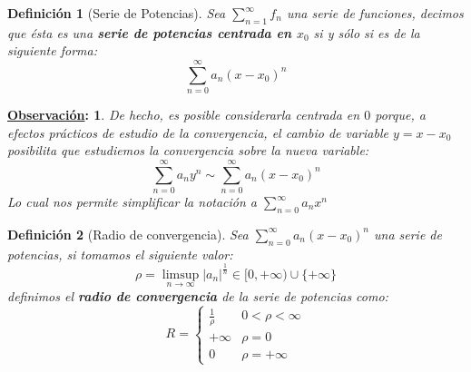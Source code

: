 \documentclass[10pt,a4paper,openright]{book}
\theoremstyle{break}
\newtheorem*{defi}{Definición}
\newtheorem*{obs}{\underline{Observación}:}
\begin{document}
\begin{defi}[Serie de Potencias]
Sea $\sum_{n=1}^\infty f_n$ una serie de funciones, decimos que ésta es una \textbf{serie de potencias centrada en $x_0$} si y sólo si es de la siguiente forma:
$$\sum_{n=0}^{\infty} a_n (x - x_0)^n$$
\end{defi}

\begin{obs}
De hecho, es posible considerarla centrada en $0$ porque, a efectos prácticos de estudio de la convergencia, el cambio de variable $y = x - x_0$ posibilita que estudiemos la convergencia sobre la nueva variable:
$$\sum_{n = 0}^{\infty} a_n y^n \sim \sum_{n=0}^{\infty} a_n (x - x_0)^n$$
Lo cual nos permite simplificar la notación a $\sum_{n=0}^{\infty} a_n x^n$
\end{obs}

\begin{defi}[Radio de convergencia]
Sea $\sum_{n=0}^{\infty} a_n (x - x_0)^n$ una serie de potencias, si tomamos el siguiente valor:
$$\rho =  \underset{n \to \infty}\limsup |a_n|^{\frac{1}{n}} \in [0, +\infty) \cup \{+ \infty\}$$
definimos el \textbf{radio de convergencia} de la serie de potencias como:
$$R = \begin{cases} \frac{1}{\rho}  & 0 < \rho < \infty \\ +\infty   & \rho = 0 \\ 0   & \rho = +\infty \end{cases}$$
\end{defi}
\end{document}
